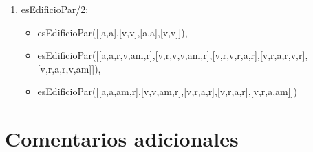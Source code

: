 \documentclass[12pt, a4paper, spanish]{article}
\begin{document}
\begin{enumerate}
\item \underline{esEdificioPar/2}:
\begin{itemize}
	\item esEdificioPar([[a,a],[v,v],[a,a],[v,v]]),             
	\item esEdificioPar([[a,a,r,v,am,r],[v,r,v,v,am,r],[v,r,v,r,a,r],[v,r,a,r,v,r],[v,r,a,r,v,am]]),             
	\item esEdificioPar([[a,a,am,r],[v,v,am,r],[v,r,a,r],[v,r,a,r],[v,r,a,am]])
\end{itemize}

\end{enumerate}

\section{Comentarios adicionales}
\end{document}
